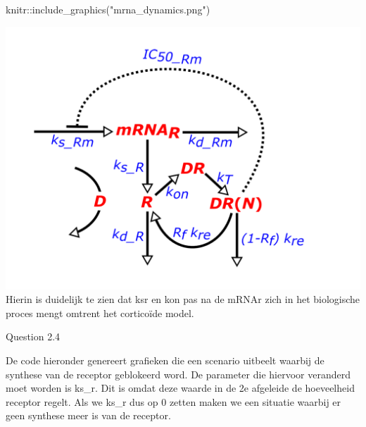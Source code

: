 \documentclass[
]{article}
\newenvironment{Shaded}{\begin{snugshade}}{\end{snugshade}}
\newcommand{\FunctionTok}[1]{\textcolor[rgb]{0.00,0.00,0.00}{#1}}
\newcommand{\NormalTok}[1]{#1}
\newcommand{\SpecialCharTok}[1]{\textcolor[rgb]{0.00,0.00,0.00}{#1}}
\newcommand{\StringTok}[1]{\textcolor[rgb]{0.31,0.60,0.02}{#1}}
\begin{document}
\begin{Shaded}
\begin{Highlighting}[]
\NormalTok{knitr}\SpecialCharTok{::}\FunctionTok{include\_graphics}\NormalTok{(}\StringTok{"mrna\_dynamics.png"}\NormalTok{)}
\end{Highlighting}
\end{Shaded}

\includegraphics[width=17.11in]{mrna_dynamics} Hierin is duidelijk te
zien dat ksr en kon pas na de mRNAr zich in het biologische proces mengt
omtrent het corticoïde model.

Question 2.4

De code hieronder genereert grafieken die een scenario uitbeelt waarbij
de synthese van de receptor geblokeerd word. De parameter die hiervoor
veranderd moet worden is ks\_r. Dit is omdat deze waarde in de 2e
afgeleide de hoeveelheid receptor regelt. Als we ks\_r dus op 0 zetten
maken we een situatie waarbij er geen synthese meer is van de receptor.
\end{document}
